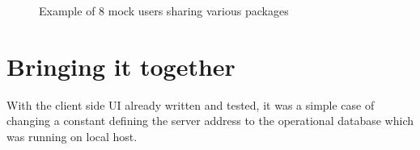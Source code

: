 \documentclass{l4proj}
\begin{document}
\begin{figure}
\caption{Example of 8 mock users sharing various packages}
\end{figure}

\section{Bringing it together}
With the client side UI already written and tested, it was a simple case of changing a constant defining the server address to the operational database which was running on local host.
\end{document}
